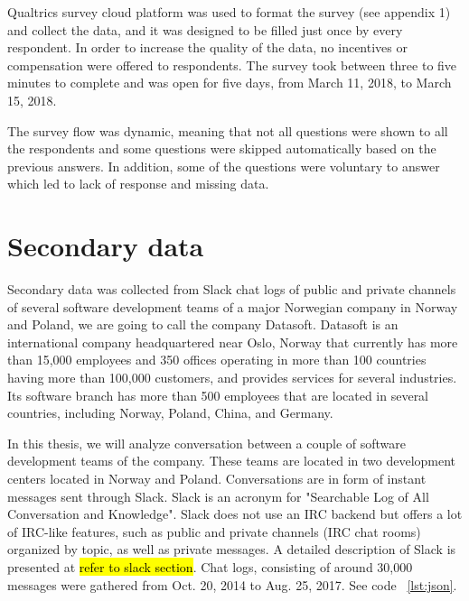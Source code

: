 Qualtrics survey cloud platform was used to format the survey (see appendix 1) and collect the data, and it was designed to be filled just once by every respondent. In order to increase the quality of the data, no incentives or compensation were offered to respondents.  The survey took between three to five minutes to complete and was open for five days, from March 11, 2018, to March 15, 2018.

The survey flow was dynamic, meaning that not all questions were shown to all the respondents and some questions were skipped automatically based on the previous answers. In addition, some of the questions were voluntary to answer which led to lack of response and missing data.

\section{Secondary data}
Secondary data was collected from Slack chat logs of public and private channels of several software development teams of a major Norwegian company in Norway and Poland, we are going to call the company Datasoft.
Datasoft is an international company headquartered near Oslo, Norway that currently has more than 15,000 employees and 350 offices operating in more than 100 countries having more than 100,000 customers, and provides services for several industries. Its software branch has more than 500 employees that are located in several countries, including Norway, Poland, China, and Germany. 

In this thesis, we will analyze conversation between a couple of software development teams of the company. These teams are located in two development centers located in Norway and Poland. Conversations are in form of instant messages sent through Slack. Slack is an acronym for "Searchable Log of All Conversation and Knowledge". Slack does not use an IRC backend but offers a lot of IRC-like features, such as public and private channels (IRC chat rooms) organized by topic, as well as private messages. A detailed description of Slack is presented at \hl{refer to slack section}.
Chat logs, consisting of around 30,000 messages were gathered from Oct. 20, 2014 to Aug. 25, 2017. See code ~\ref{lst:json}.


